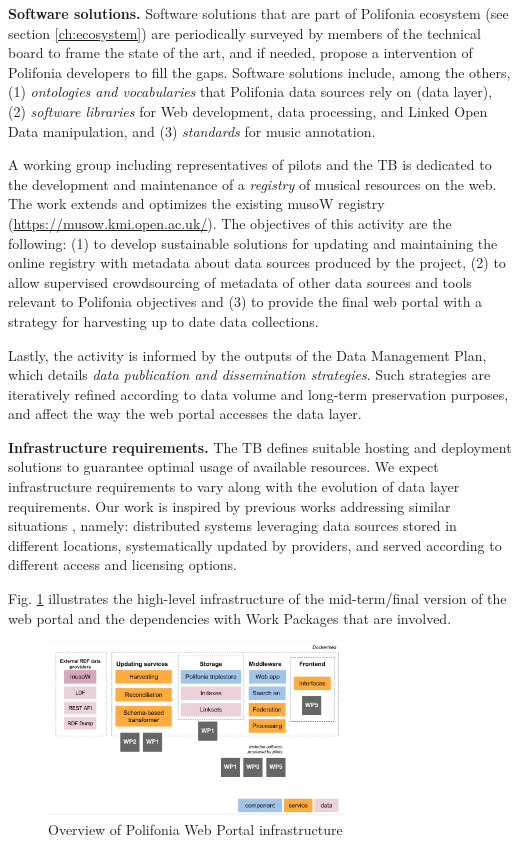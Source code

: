 \textbf{Software solutions.} Software solutions that are part of Polifonia ecosystem (see section \ref{ch:ecosystem}) are periodically surveyed by members of the technical board to frame the state of the art, and if needed, propose a intervention of Polifonia developers to fill the gaps. Software solutions include, among the others, (1) \emph{ontologies and vocabularies} that Polifonia data sources rely on (data layer), (2) \emph{software libraries} for Web development, data processing, and Linked Open Data manipulation, and (3) \emph{standards} for music annotation.

A working group including representatives of pilots and the TB is dedicated to the development and maintenance of a \emph{registry} of musical resources on the web. The work extends and optimizes the existing musoW registry (\url{https://musow.kmi.open.ac.uk/}). The objectives of this activity are the following: (1) to develop sustainable solutions for updating and maintaining the online registry with metadata about data sources produced by the project, (2) to allow supervised crowdsourcing of metadata of other data sources and tools relevant to Polifonia objectives and (3) to provide the final web portal with a strategy for harvesting up to date data collections.

Lastly, the activity is informed by the outputs of the Data Management Plan, which details \emph{data publication and dissemination strategies}. Such strategies are iteratively refined according to data volume and long-term preservation purposes, and affect the way the web portal accesses the data layer. 

\textbf{Infrastructure requirements.} The TB defines suitable hosting and deployment solutions to guarantee optimal usage of available resources. We expect infrastructure requirements to vary along with the evolution of data layer requirements. Our work is inspired by previous works addressing similar situations \cite{kirstein2019european,kirstein2020piveau}, namely: distributed systems leveraging data sources stored in different locations, systematically updated by providers, and served according to different access and licensing options.

Fig. \ref{fig:infrastructure} illustrates the high-level infrastructure of the mid-term/final version of the web portal and the dependencies with Work Packages that are involved.

\begin{figure}
    \centering
    \includegraphics[width=0.7\textwidth]{images/webportal.png}
    \caption{Overview of Polifonia Web Portal infrastructure}
    \label{fig:infrastructure}
\end{figure}

